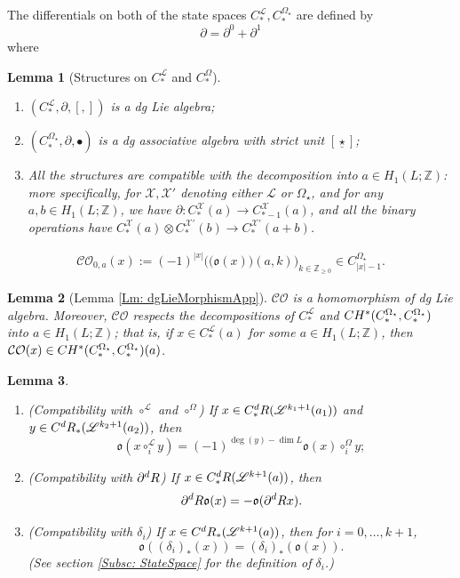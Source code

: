 \documentclass[10pt,a4paper]{amsart}
\newtheorem{lemma}{Lemma}
\newcommand{\CBa}{C_*^{\Omega_\star}}
\newcommand{\CC}{\textbf{\textup{CH}}}
\newcommand{\CFr}{C_*^\mathscr{L}}
\newcommand{\CO}{\mathcal{CO}}
\newcommand{\Cba}[1]{C_{#1}^{\Omega_\star}}
\newcommand{\Z}{\mathbb{Z}}
\newcommand{\dR}{\textup{dR}}
\begin{document}
The differentials on both of the state spaces $\CFr,\CBa$ are defined by \begin{equation}\label{Eq: differential}\partial = \partial^0 + \partial^1\end{equation} where

\begin{lemma}
	[Structures on $C_*^\mathscr{L}$ and $C_*^\Omega$]\label{Lm: StructuresOnStates}
	\begin{enumerate}
		\item $(\CFr, \partial, [,])$ is a dg Lie algebra;
		\item $(\CBa, \partial, \bullet)$ is a dg associative algebra with strict unit $[\underline{\star}]$; 
		\item All the structures are compatible with the decomposition into $a\in H_1(L;\Z)$: more specifically, for $\mathcal{X},\mathcal{X}'$ denoting either $\mathscr{L}$ or $\Omega_\star$, and for any $a,b\in H_1(L;\Z)$, we  have $\partial\colon C_*^\mathcal{X}(a)\to C_{*-1}^\mathcal{X}(a)$, and all the binary operations have $C_*^\mathcal{X}(a)\otimes C_*^{\mathcal{X}'}(b)\to C_*^{\mathcal{X}'}(a+b)$.
	\end{enumerate}
\end{lemma}

\begin{align}\label{Eq: CO0 OpenClosed}
\CO_{0,a}(x) := {(-1)^{|x|}}\bigg(\big(\mathfrak{o}(x)\big)(a,k)\bigg)_{k\in \Z_{\geq 0}} \in \Cba{|x|-1} .\end{align}

\begin{lemma}[Lemma \ref{Lm: dgLieMorphismApp}]\label{Lm: dgLieMorphism}
	$\CO$ is a homomorphism of dg Lie algebra. Moreover, $\CO$ respects the decompositions of $\CFr$ and $\CC^*(\CBa,\CBa)$ into $a\in H_1(L;\Z)$; that is, if $x\in \CFr(a)$ for some $a\in H_1(L;\Z)$, then $\CO(x)\in \CC^*(\CBa,\CBa)(a)$.
\end{lemma}

\begin{lemma}\label{Lm: AnomalyApp}
	\begin{enumerate}
		\item (Compatibility with $\circ^\mathscr{L}$ and $\circ^\Omega$) If $x\in C_*^\dR(\mathscr{L}^{k_1+1}(a_1))$ and $y\in C^\dR_*(\mathscr{L}^{k_2+1}(a_2))$, then \[ \mathfrak{o}(x\circ_i^\mathscr{L} y) = (-1)^{\deg(y)-\dim L}\mathfrak{o}(x) \circ_i^\Omega y; \]
		\item (Compatibility with $\partial^\dR$)  If $x\in C_*^\dR(\mathscr{L}^{k+1}(a))$, then \[ \partial^\dR \mathfrak{o}(x) =-\mathfrak{o}(\partial^\dR x). \]
		\item (Compatibility with $\delta_i$) If $x\in C^\dR_*(\mathscr{L}^{k+1}(a))$, then for $i=0,\dots, k+1$, \[ \mathfrak{o}((\delta_i)_*(x)) = (\delta_i)_*(\mathfrak{o}(x)). \](See section \ref{Subsc: StateSpace}  for the definition of $\delta_i$.)
	\end{enumerate}
\end{lemma}
\end{document}
